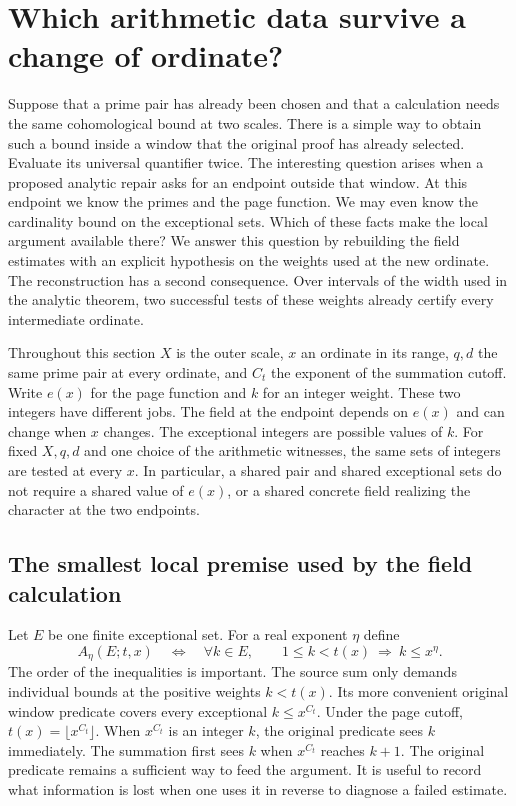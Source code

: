 \documentclass[12pt,letterpaper]{article}
\begin{document}
\section{Which arithmetic data survive a change of ordinate?}
\label{sec:endpoint-fields}

Suppose that a prime pair has already been chosen and that a calculation needs the same cohomological bound at two scales. There is a simple way to obtain such a bound inside a window that the original proof has already selected. Evaluate its universal quantifier twice. The interesting question arises when a proposed analytic repair asks for an endpoint outside that window. At this endpoint we know the primes and the page function. We may even know the cardinality bound on the exceptional sets. Which of these facts make the local argument available there? We answer this question by rebuilding the field estimates with an explicit hypothesis on the weights used at the new ordinate. The reconstruction has a second consequence. Over intervals of the width used in the analytic theorem, two successful tests of these weights already certify every intermediate ordinate.

Throughout this section $X$ is the outer scale, $x$ an ordinate in its range, $q,d$ the same prime pair at every ordinate, and $C_t$ the exponent of the summation cutoff. Write $e(x)$ for the page function and $k$ for an integer weight. These two integers have different jobs. The field at the endpoint depends on $e(x)$ and can change when $x$ changes. The exceptional integers are possible values of $k$. For fixed $X,q,d$ and one choice of the arithmetic witnesses, the same sets of integers are tested at every $x$. In particular, a shared pair and shared exceptional sets do not require a shared value of $e(x)$, or a shared concrete field realizing the character at the two endpoints.

\subsection{The smallest local premise used by the field calculation}

Let $E$ be one finite exceptional set. For a real exponent $\eta$ define
\[
   A_{\eta}(E;t,x)\quad\Longleftrightarrow\quad
     \forall k\in E,\qquad 1\leq k<t(x)\ \Longrightarrow\ k\leq x^{\eta}.
\]
The order of the inequalities is important. The source sum only demands individual bounds at the positive weights $k<t(x)$. Its more convenient original window predicate covers every exceptional $k\leq x^{C_t}$. Under the page cutoff, $t(x)=\lfloor x^{C_t}\rfloor$. When $x^{C_t}$ is an integer $k$, the original predicate sees $k$ immediately. The summation first sees $k$ when $x^{C_t}$ reaches $k+1$. The original predicate remains a sufficient way to feed the argument. It is useful to record what information is lost when one uses it in reverse to diagnose a failed estimate.
\end{document}
